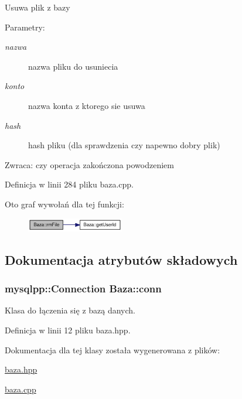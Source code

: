 Usuwa plik z bazy \begin{Desc}
\item[Parametry:]
\begin{description}
\item[{\em nazwa}]nazwa pliku do usuniecia \item[{\em konto}]nazwa konta z ktorego sie usuwa \item[{\em hash}]hash pliku (dla sprawdzenia czy napewno dobry plik) \end{description}
\end{Desc}
\begin{Desc}
\item[Zwraca:]czy operacja zakończona powodzeniem \end{Desc}


Definicja w linii 284 pliku baza.cpp.

Oto graf wywołań dla tej funkcji:\nopagebreak
\begin{figure}[H]
\begin{center}
\leavevmode
\includegraphics[width=120pt]{d8/d84/a00001_7161c573401166cc5f7d98ae6f335b44_cgraph}
\end{center}
\end{figure}


\subsection{Dokumentacja atrybutów składowych}
\hypertarget{a00001_f966364deec225fdf2d2d22550c71c88}{
\subsubsection[{conn}]{\setlength{\rightskip}{0pt plus 5cm}mysqlpp::Connection {\bf Baza::conn}}}
\label{d8/d84/a00001_f966364deec225fdf2d2d22550c71c88}


Klasa do łączenia się z bazą danych. 



Definicja w linii 12 pliku baza.hpp.

Dokumentacja dla tej klasy została wygenerowana z plików:\begin{CompactItemize}
\item 
\hyperlink{a00007}{baza.hpp}\item 
\hyperlink{a00006}{baza.cpp}\end{CompactItemize}
